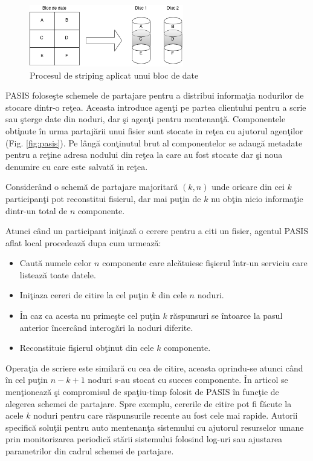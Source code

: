 \documentclass{llncs}
\begin{document}
\begin{figure}
	\label{fig:raid_strip}
	\begin{center}
	\includegraphics[width=0.6\textwidth]{img/raid0.png}
	\caption{Procesul de striping aplicat unui bloc de date}
	\end{center}
	\bigskip
\end{figure}

PASIS folose\c{s}te schemele de partajare pentru a distribui informa\c{t}ia nodurilor de stocare dintr-o re\c{t}ea. Aceasta introduce agen\c{t}i pe partea clientului pentru a scrie sau \c{s}terge date din noduri, dar \c{s}i agen\c{t}i pentru mentenan\c{t}\u{a}. Componentele obt\c{i}nute \^{i}n urma partaj\u{a}rii unui fisier sunt stocate in re\c{t}ea cu ajutorul agen\c{t}ilor (Fig. \ref{fig:pasis}). Pe l\^{a}ng\u{a} con\c{t}inutul brut al componentelor se adaug\u{a} metadate pentru a re\c{t}ine adresa nodului din re\c{t}ea la care au fost stocate dar \c{s}i noua denumire cu care este salvat\u{a} in re\c{t}ea.

Consider\^{a}nd o schem\u{a} de partajare majoritar\u{a} $(k, n)$ unde oricare din cei $k$ participan\c{t}i pot reconstitui fisierul, dar mai pu\c{t}in de $k$ nu ob\c{t}in nicio informa\c{t}ie dintr-un total de $n$ componente. 

Atunci c\^{a}nd un participant ini\c{t}iaz\u{a} o cerere pentru a citi un fisier, agentul PASIS aflat local procedeaz\u{a} dupa cum urmeaz\u{a}:
\begin{itemize}
	\item Caut\u{a} numele celor $n$ componente care alc\u{a}tuiesc fi\c{s}ierul \^{i}ntr-un serviciu care listeaz\u{a} toate datele.
	\item Ini\c{t}iaza cereri de citire la cel pu\c{t}in $k$ din cele $n$ noduri.
	\item \^{I}n caz ca acesta nu prime\c{s}te cel pu\c{t}in $k$ r\u{a}spunsuri se \^{i}ntoarce la pasul anterior \^{i}ncerc\^{a}nd interog\u{a}ri la noduri diferite.
	\item Reconstituie fi\c{s}ierul ob\c{t}inut din cele $k$ componente.
\end{itemize}
Opera\c{t}ia de scriere este similar\u{a} cu cea de citire, aceasta oprindu-se atunci c\^{a}nd \^{i}n cel pu\c{t}in $n - k + 1$ noduri s-au stocat cu succes componente.
\^{I}n articol se men\c{t}ioneaz\u{a} \c{s}i compromisul de spa\c{t}iu-timp folosit de PASIS \^{i}n func\c{t}ie de alegerea schemei de partajare. Spre exemplu, cererile de citire pot fi f\u{a}cute la acele $k$ noduri pentru care r\u{a}spunsurile recente au fost cele mai rapide.
Autorii specific\u{a} solu\c{t}ii pentru auto mentenan\c{t}a sistemului cu ajutorul resurselor umane prin monitorizarea periodic\u{a} st\u{a}rii sistemului folosind log-uri sau ajustarea parametrilor din cadrul schemei de partajare.
\end{document}
